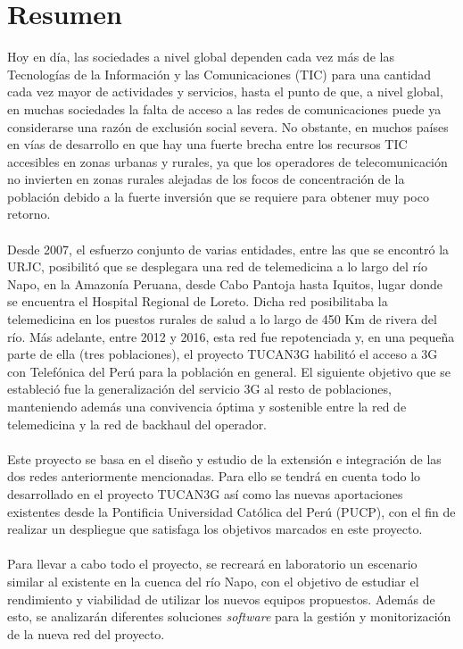 \chapter*{Resumen}
\thispagestyle{empty}
\label{cap:resumen}

Hoy en día, las sociedades a nivel global dependen cada vez más de las Tecnologías de la Información y las Comunicaciones (TIC) para una cantidad cada vez mayor de actividades y servicios, hasta el punto de que, a nivel global, en muchas sociedades la falta de acceso a las redes de comunicaciones puede ya considerarse una razón de exclusión social severa. No obstante, en muchos países en vías de desarrollo en que hay una fuerte brecha entre los recursos TIC accesibles en zonas urbanas y rurales, ya que los operadores de telecomunicación no invierten en zonas rurales alejadas de los focos de concentración de la población debido a la fuerte inversión que se requiere para obtener muy poco retorno.\\\\

Desde 2007, el esfuerzo conjunto de varias entidades, entre las que se encontró la URJC, posibilitó que se desplegara una red de telemedicina a lo largo del río Napo, en la Amazonía Peruana, desde Cabo Pantoja hasta Iquitos, lugar donde se encuentra el Hospital Regional de Loreto. Dicha red posibilitaba la telemedicina en los puestos rurales de salud a lo largo de 450 Km de rivera del río. Más adelante, entre 2012 y 2016, esta red fue repotenciada y, en una pequeña parte de ella (tres poblaciones), el proyecto TUCAN3G habilitó el acceso a 3G con Telefónica del Perú para la población en general. El siguiente objetivo que se estableció fue la generalización del servicio 3G al resto de poblaciones, manteniendo además una convivencia óptima y sostenible entre la red de telemedicina y la red de backhaul del operador.\\\\

Este proyecto se basa en el diseño y estudio de la extensión e integración de las dos redes anteriormente mencionadas. Para ello se tendrá en cuenta todo lo desarrollado en el proyecto TUCAN3G así como las nuevas aportaciones existentes desde la Pontificia Universidad Católica del Perú (PUCP), con el fin de realizar un despliegue que satisfaga los objetivos marcados en este proyecto.\\\\

Para llevar a cabo todo el proyecto, se recreará en laboratorio un escenario similar al existente en la cuenca del río Napo, con el objetivo de estudiar el rendimiento y viabilidad de utilizar los nuevos equipos propuestos. Además de esto, se analizarán diferentes soluciones \textit{software} para la gestión y monitorización de la nueva red del proyecto.\\\\

\afterpage{\null\newpage}